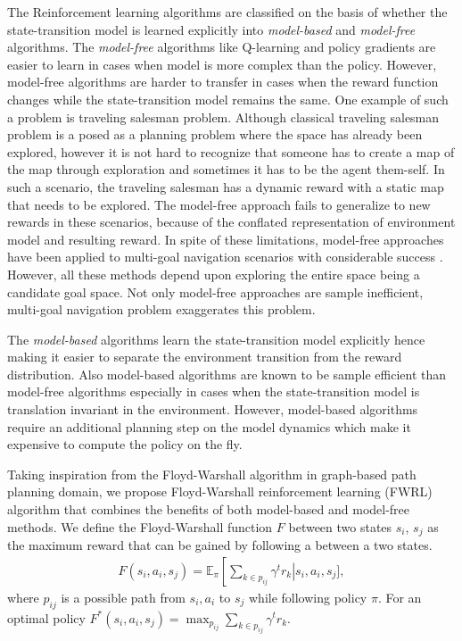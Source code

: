 \documentclass[letterpaper]{article} %
\def\state{s}
\def\act{a}
\def\E{\mathbb{E}}
\newcommand{\state}[2]{\mathbf{s}^{#1}(#2)}
\newcommand{\discount}{\gamma}
\begin{document}
The Reinforcement learning algorithms are classified on the basis of whether
the state-transition model is learned explicitly into \emph{model-based}
and \emph{model-free} algorithms.
%
The \emph{model-free} algorithms like Q-learning and policy gradients are easier to learn in cases when model is more complex than the policy.
However, model-free algorithms are harder to transfer in cases when the reward function changes while the state-transition model remains the same.
One example of such a problem is traveling salesman problem.
Although classical traveling salesman problem is a posed as a planning problem where the space has already been explored, however it is not hard to recognize that someone has to create a map of the map through exploration and sometimes it has to be the agent them-self.
In such a scenario, the traveling salesman has a dynamic reward with a static map that needs to be
explored.
The model-free approach fails to generalize to new rewards in these scenarios, because of the conflated representation of environment model and resulting reward.
In spite of these limitations, model-free approaches have been applied to multi-goal navigation
scenarios with considerable success \cite{Piotr Mirowski's multi-landmark paper, Universal planning functions}.
However, all these methods depend upon exploring the entire space being a candidate goal space.
Not only model-free approaches are sample inefficient, multi-goal navigation problem exaggerates this problem.

The \emph{model-based} algorithms learn the state-transition model explicitly hence making it
easier to separate the environment transition from the reward distribution. Also model-based
algorithms are known to be sample efficient than model-free algorithms especially in cases when
the state-transition model is translation invariant in the environment. 
However, model-based algorithms require an additional planning step on the model dynamics
which make it expensive to compute the policy on the fly.

Taking inspiration from the Floyd-Warshall algorithm in graph-based path planning domain, we propose Floyd-Warshall reinforcement learning (FWRL) algorithm that combines the benefits of both
model-based and model-free methods.
We define the Floyd-Warshall function $F$ between two states $\state_i$, $\state_j$ as the maximum reward that can be gained by following a between a two states.
\begin{align}
F(\state_i, \act_i, \state_j) = \E_{\pi}\left[
\sum_{k \in p_{ij} } \discount^{t} r_{k} \right.\left| \state_i, \act_i, \state_j\Biggr],
\end{align}
where $p_{ij}$ is a possible path from $\state_i, \act_i$ to $\state_j$ while following policy $\pi$. For an optimal policy $
F^*(\state_i, \act_i, \state_j) = \max_{p_{ij}} \sum_{k \in p_{ij} } \discount^{t} r_{k}$.
\end{document}
